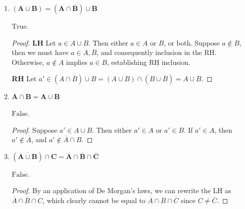 \documentclass[10pt, oneside]{article}
\begin{document}
\begin{enumerate}[label=1.\arabic*]
\begin{enumerate}
\begin{proof}
	\textbf{RH}. Let $a' \in A \cup (B \cap C)$. Then $a' \in A$ or $a' \in B \cap C$ or both. If $a' \in A$, then $a' \in A \cup B, A \cup C$, so $a' \in (A \cup B) \cap (A \cup C)$. If $a' \in B \cap C$, then $a' \in B, C$, so $a' \in A \cup B, A \cup C$, so $a' \in (A \cup B) \cap (A \cup C)$.
	\end{proof}

	\item  \begin{tcolorbox}[
	  colback=Cerulean!5!white,
	  colframe=Cerulean!75!black]
	\textbf{$\bm{(A \cup B) = (A \cap \overline{B}) \cup B}$}
	\end{tcolorbox}
	
	$\boxed{\text{True}}$.
	
	\begin{proof}
	\textbf{LH} Let $a \in A \cup B$. Then either $a \in A$ or $B$, or both. Suppose $a \notin B$, then we must have $a \in A, \overline{B}$, and consequently inclusion in the RH. Otherwise, $a \notin A$ implies $a \in B$, establishing RH inclusion.
	
	\textbf{RH} Let $a' \in (A \cap \overline{B}) \cup B = (A \cup B) \cap (B \cup \overline{B}) = A \cup B$.
	\end{proof}
	
	\item  \begin{tcolorbox}[
	  colback=Cerulean!5!white,
	  colframe=Cerulean!75!black]
	\textbf{$\bm{\overline{A} \cap B = A \cup B}$}
	\end{tcolorbox}
	
	$\boxed{\text{False}}$.
	
	\begin{proof}
	Suppose $a' \in A \cup B$. Then either $a' \in A$ or $a' \in B$. If $a' \in A$, then $a' \notin \overline{A}$, and $a' \notin \overline{A} \cap B$.
	\end{proof}
	
	\item  \begin{tcolorbox}[
	  colback=Cerulean!5!white,
	  colframe=Cerulean!75!black]
	\textbf{$\bm{(\overline{A \cup B}) \cap C = \overline{A} \cap \overline{B} \cap \overline{C}}$}
	\end{tcolorbox}
	
	$\boxed{\text{False}}$.
	
	\begin{proof}
	By an application of De Morgan's laws, we can rewrite the LH as $\overline{A} \cap \overline{B} \cap C$, which clearly cannot be equal to $\overline{A} \cap \overline{B} \cap \overline{C}$ since $C \neq \overline{C}$.
	\end{proof}
	

\end{enumerate}
\end{enumerate}
\end{document}
